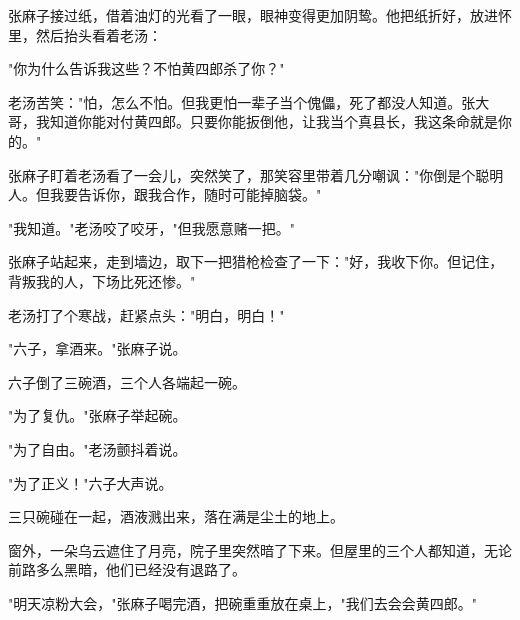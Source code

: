 张麻子接过纸，借着油灯的光看了一眼，眼神变得更加阴鸷。他把纸折好，放进怀里，然后抬头看着老汤：

"你为什么告诉我这些？不怕黄四郎杀了你？"

老汤苦笑："怕，怎么不怕。但我更怕一辈子当个傀儡，死了都没人知道。张大哥，我知道你能对付黄四郎。只要你能扳倒他，让我当个真县长，我这条命就是你的。"

张麻子盯着老汤看了一会儿，突然笑了，那笑容里带着几分嘲讽："你倒是个聪明人。但我要告诉你，跟我合作，随时可能掉脑袋。"

"我知道。"老汤咬了咬牙，"但我愿意赌一把。"

张麻子站起来，走到墙边，取下一把猎枪检查了一下："好，我收下你。但记住，背叛我的人，下场比死还惨。"

老汤打了个寒战，赶紧点头："明白，明白！"

"六子，拿酒来。"张麻子说。

六子倒了三碗酒，三个人各端起一碗。

"为了复仇。"张麻子举起碗。

"为了自由。"老汤颤抖着说。

"为了正义！"六子大声说。

三只碗碰在一起，酒液溅出来，落在满是尘土的地上。

窗外，一朵乌云遮住了月亮，院子里突然暗了下来。但屋里的三个人都知道，无论前路多么黑暗，他们已经没有退路了。

"明天凉粉大会，"张麻子喝完酒，把碗重重放在桌上，"我们去会会黄四郎。"